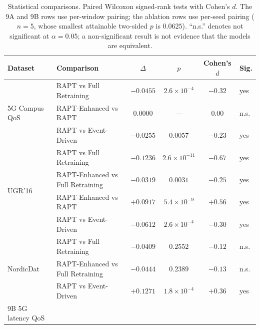 \begin{table}[t]
\centering
\caption{Statistical comparisons. Paired Wilcoxon signed-rank tests with Cohen's
$d$. The 9A and 9B rows use per-window pairing; the ablation rows use per-seed
pairing ($n=5$, whose smallest attainable two-sided $p$ is $0.0625$). ``n.s.''
denotes not significant at $\alpha = 0.05$; a non-significant result is not
evidence that the models are equivalent.}
\label{tab:results_stats}
\begin{tabular}{llcccl}
\toprule
Dataset & Comparison & $\Delta$ & $p$ & Cohen's $d$ & Sig. \\
\midrule
\multirow{3}{*}{5G Campus QoS}
 & RAPT vs Full Retraining          & $-0.0455$ & $2.6\times10^{-4}$ & $-0.32$ & yes \\
 & RAPT-Enhanced vs RAPT            & $0.0000$  & ---                & $0.00$  & n.s. \\
 & RAPT vs Event-Driven             & $-0.0255$ & $0.0057$           & $-0.23$ & yes \\
\midrule
\multirow{4}{*}{UGR'16}
 & RAPT vs Full Retraining          & $-0.1236$ & $2.6\times10^{-11}$ & $-0.67$ & yes \\
 & RAPT-Enhanced vs Full Retraining & $-0.0319$ & $0.0031$            & $-0.25$ & yes \\
 & RAPT-Enhanced vs RAPT            & $+0.0917$ & $5.4\times10^{-9}$  & $+0.56$ & yes \\
 & RAPT vs Event-Driven             & $-0.0612$ & $2.6\times10^{-4}$  & $-0.30$ & yes \\
\midrule
\multirow{3}{*}{NordicDat}
 & RAPT vs Full Retraining          & $-0.0409$ & $0.2552$ & $-0.12$ & n.s. \\
 & RAPT-Enhanced vs Full Retraining & $-0.0444$ & $0.2389$ & $-0.13$ & n.s. \\
 & RAPT vs Event-Driven             & $+0.1271$ & $1.8\times10^{-4}$ & $+0.36$ & yes \\
\midrule
\multirow{3}{*}{9B 5G latency QoS}

\end{tabular}
\end{table}
